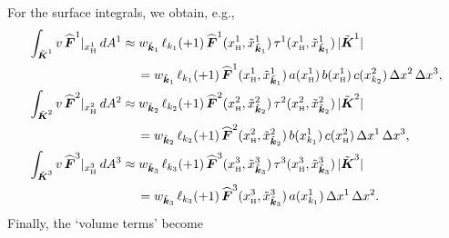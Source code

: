 \documentclass[10pt,preprint]{aastex}
\newcommand{\dx}{\Delta x}
\begin{document}
For the surface integrals, we obtain, e.g., 
\begin{align}
  \int_{\tilde{\bK}^{1}}v\,\widehat{\bF}^{1}|_{x_{\Hgh}^{1}}\,dA^{1}
  &\approx w_{\tilde{\bk}_{1}}\,\ell_{k_{1}}(+1)\,\widehat{\bF}^{1}(x_{\Hgh}^{1},\tilde{x}_{\tilde{\bk}_{1}}^{1})\,
  \tau^{1}(x_{\Hgh}^{1},\tilde{x}_{\tilde{\bk}_{1}}^{1})\,|\tilde{\bK}^{1}| \nonumber \\
  &\hspace{12pt}
  =w_{\tilde{\bk}_{1}}\,\ell_{k_{1}}(+1)\,\widehat{\bF}^{1}(x_{\Hgh}^{1},\tilde{x}_{\tilde{\bk}_{1}}^{1})\,
  a(x_{\Hgh}^{1})\,b(x_{\Hgh}^{1})\,c(x_{k_{2}}^{2})\,\dx^{2}\,\dx^{3}, \\
  \int_{\tilde{\bK}^{2}}v\,\widehat{\bF}^{2}|_{x_{\Hgh}^{2}}\,dA^{2}
  &\approx w_{\tilde{\bk}_{2}}\,\ell_{k_{2}}(+1)\,\widehat{\bF}^{2}(x_{\Hgh}^{2},\tilde{x}_{\tilde{\bk}_{2}}^{2})\,
  \tau^{2}(x_{\Hgh}^{2},\tilde{x}_{\tilde{\bk}_{2}}^{2})\,|\tilde{\bK}^{2}| \nonumber \\
  &\hspace{12pt}
  =w_{\tilde{\bk}_{2}}\,\ell_{k_{2}}(+1)\,\widehat{\bF}^{2}(x_{\Hgh}^{2},\tilde{x}_{\tilde{\bk}_{2}}^{2})\,
  b(x_{k_{1}}^{1})\,c(x_{\Hgh}^{2})\,\dx^{1}\,\dx^{3}, \\
  \int_{\tilde{\bK}^{3}}v\,\widehat{\bF}^{3}|_{x_{\Hgh}^{3}}\,dA^{3}
  &\approx w_{\tilde{\bk}_{3}}\,\ell_{k_{3}}(+1)\,\widehat{\bF}^{3}(x_{\Hgh}^{3},\tilde{x}_{\tilde{\bk}_{3}}^{3})\,
  \tau^{3}(x_{\Hgh}^{3},\tilde{x}_{\tilde{\bk}_{3}}^{3})\,|\tilde{\bK}^{3}| \nonumber \\
  &\hspace{12pt}
  =w_{\tilde{\bk}_{3}}\,\ell_{k_{3}}(+1)\,\widehat{\bF}^{3}(x_{\Hgh}^{3},\tilde{x}_{\tilde{\bk}_{3}}^{3})\,
  a(x_{k_{1}}^{1})\,\dx^{1}\,\dx^{2}.  
\end{align}
Finally, the `volume terms' become
\end{document}
